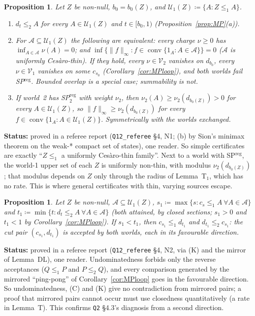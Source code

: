 \documentclass[11pt]{article}
\newtheorem{proposition}[theorem]{Proposition}
\theoremstyle{definition}
\theoremstyle{remark}
\newcommand{\co}{\operatorname{conv}}
\newcommand{\src}[1]{\texttt{#1}}
\newcommand{\status}[1]{\par\smallskip\noindent\textbf{Status:} #1\par\smallskip}
\begin{document}
\begin{proposition}\label{prop:N1}
Let $Z$ be non-null, $b_0=b_0(Z)$, and $\mathcal U_1(Z)\coloneqq\{A:Z\le_1A\}$.
\begin{enumerate}[leftmargin=*,label=(\alph*)]
\item $d_t\le_2A$ for every $A\in\mathcal U_1(Z)$ and $t\in[b_0,1)$ (Proposition~\ref{prop:MP}(a)).
\item For $\mathcal A\subseteq\mathcal U_1(Z)$ the following are equivalent: every charge $\nu\ge0$ has $\inf_{A\in\mathcal A}\nu(A)=0$; and $\inf\{\|f\|_\infty:f\in\co\{1_A:A\in\mathcal A\}\}=0$ (\emph{$\mathcal A$ is uniformly Ces\`aro-thin}). If they hold, every $\nu\in\mathcal V_2$ vanishes on $d_{b_0}$, every $\nu\in\mathcal V_1$ vanishes on some $c_{s_0}$ (Corollary~\ref{cor:MPloop}), and both worlds fail SP$^{\mathrm{reg}}$. Bounded overlap is a special case; summability is not.
\item If world~2 has SP$^{\mathrm{reg}}_2$ with weight $\nu_2$, then $\nu_2(A)\ge\nu_2(d_{b_0(Z)})>0$ for every $A\in\mathcal U_1(Z)$, so $\|f\|_\infty\ge\nu_2(d_{b_0(Z)})$ for every $f\in\co\{1_A:A\in\mathcal U_1(Z)\}$. Symmetrically with the worlds exchanged.
\end{enumerate}
\end{proposition}
\status{proved in a referee report (\src{Q12\_referee} \S4, N1; (b) by Sion's minimax theorem on the weak-* compact set of states), one reader. So simple certificates are exactly ``$Z\le_1$ a uniformly Ces\`aro-thin family''. Next to a world with SP$^{\mathrm{reg}}$, the world-1 upper set of each $Z$ is uniformly non-thin, with modulus $\nu_2(d_{b_0(Z)})$; that modulus depends on $Z$ only through the radius of Lemma~T$_1$, which has no rate. This is where general certificates with thin, varying sources escape.}

\begin{proposition}\label{prop:N2}
Let $Z$ be non-null, $\mathcal A\subseteq\mathcal U_1(Z)$, $s_1\coloneqq\max\{s:c_s\le_1A\ \forall A\in\mathcal A\}$ and $t_1\coloneqq\min\{t:d_t\le_2A\ \forall A\in\mathcal A\}$ (both attained, by closed sections; $s_1>0$ and $t_1<1$ by Corollary~\ref{cor:MPloop}). If $s_1<t_1$, then $c_{s_1}\le_1d_{t_1}$ and $d_{t_1}\le_2c_{s_1}$: the cut pair $(c_{s_1},d_{t_1})$ is accepted by both worlds, each in its favourable direction.
\end{proposition}
\status{proved in a referee report (\src{Q12\_referee} \S4, N2, via (K) and the mirror of Lemma~DL), one reader. Undominatedness forbids only the reverse acceptances ($Q\le_1P$ and $P\le_2Q$), and every comparison generated by the mirrored ``ping-pong'' of Corollary~\ref{cor:MPloop} goes in the favourable direction. So undominatedness, (C) and (K) give no contradiction from mirrored pairs; a proof that mirrored pairs cannot occur must use closedness quantitatively (a rate in Lemma~T). This confirms \src{Q2} \S4.3's diagnosis from a second direction.}
\end{document}
